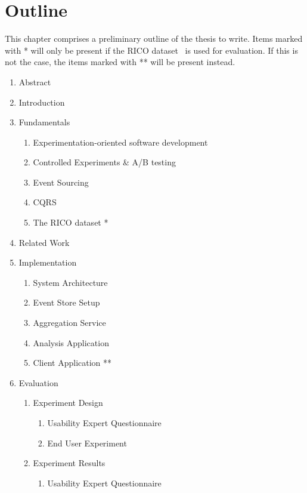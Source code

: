 %
\chapter{Outline}
\label{sec:outline}

This chapter comprises a preliminary outline of the thesis to write.
Items marked with * will only be present if the RICO dataset~\cite{Deka:2017:Rico} is used for evaluation.
If this is not the case, the items marked with ** will be present instead.

\begin{enumerate}[noitemsep,label=\arabic*.]
\item Abstract
\item Introduction
\item Fundamentals
	\begin{enumerate}[noitemsep,label=\arabic*.]
	\item Experimentation-oriented software development
	\item Controlled Experiments \& A/B testing
	\item Event Sourcing
	\item CQRS
	\item The RICO dataset *
	\end{enumerate}
\item Related Work
\item Implementation
	\begin{enumerate}[noitemsep,label=\arabic*.]
	\item System Architecture
	\item Event Store Setup
	\item Aggregation Service
	\item Analysis Application
	\item Client Application **
	\end{enumerate}
\item Evaluation
	\begin{enumerate}[noitemsep,label=\arabic*.]
	\item Experiment Design
		\begin{enumerate}[noitemsep,label=\arabic*.]
		\item Usability Expert Questionnaire
		\item End User Experiment
		\end{enumerate}
	\item Experiment Results
		\begin{enumerate}[noitemsep,label=\arabic*.]
		\item Usability Expert Questionnaire

\end{enumerate}
\end{enumerate}
\end{enumerate}
